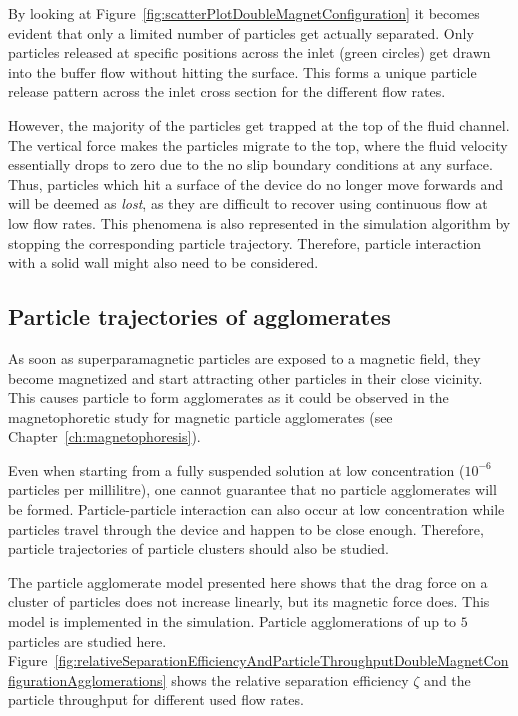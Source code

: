 By looking at Figure~\ref{fig:scatterPlotDoubleMagnetConfiguration} it becomes evident that only a limited number of particles get actually separated. Only particles released at specific positions across the inlet (green circles) get drawn into the buffer flow without hitting the surface. This forms a unique particle release pattern across the inlet cross section for the different flow rates.

However, the majority of the particles get trapped at the top of the fluid channel. The vertical force makes the particles migrate to the top, where the fluid velocity essentially drops to zero due to the no slip boundary conditions at any surface. Thus, particles which hit a surface of the device do no longer move forwards and will be deemed as \textit{lost}, as they are difficult to recover using continuous flow at low flow rates. This phenomena is also represented in the simulation algorithm by stopping the corresponding particle trajectory. Therefore, particle interaction with a solid wall might also need to be considered.

\subsection{Particle trajectories of agglomerates}
\label{subsec:particleTrajectoriesOfAgglomerates}
As soon as superparamagnetic particles are exposed to a magnetic field, they become magnetized and start attracting other particles in their close vicinity. This causes particle to form agglomerates as it could be observed in the magnetophoretic study for magnetic particle agglomerates (see Chapter~\ref{ch:magnetophoresis}).

Even when starting from a fully suspended solution at low concentration ($10^{-6}$ particles per millilitre), one cannot guarantee that no particle agglomerates will be formed. Particle-particle interaction can also occur at low concentration while particles travel through the device and happen to be close enough. Therefore, particle trajectories of particle clusters should also be studied. 
 
The particle agglomerate model presented here shows that the drag force on a cluster of particles does not increase linearly, but its magnetic force does. This model is implemented in the simulation. Particle agglomerations of up to $5$ particles are studied here. Figure~\ref{fig:relativeSeparationEfficiencyAndParticleThroughputDoubleMagnetConfigurationAgglomerations} shows the relative separation efficiency $\zeta$ and the particle throughput for different used flow rates.

